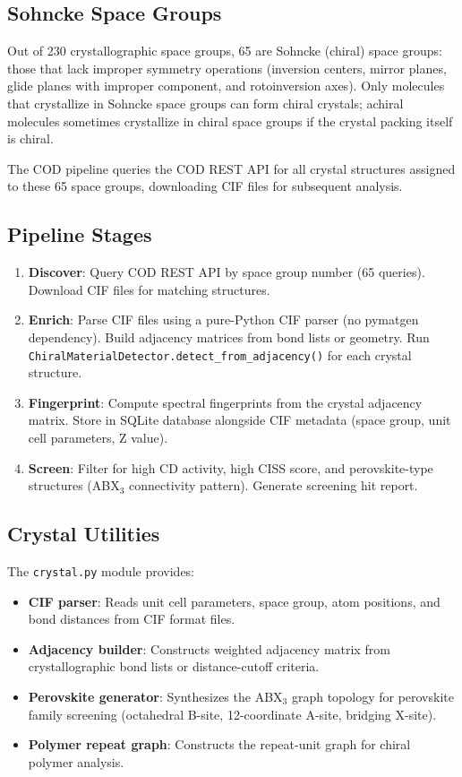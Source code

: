 \documentclass[11pt,a4paper]{article}
\begin{document}
\subsection{Sohncke Space Groups}

Out of 230 crystallographic space groups, 65 are Sohncke (chiral) space groups:
those that lack improper symmetry operations (inversion centers, mirror planes,
glide planes with improper component, and rotoinversion axes). Only molecules
that crystallize in Sohncke space groups can form chiral crystals; achiral
molecules sometimes crystallize in chiral space groups if the crystal packing
itself is chiral.

The COD pipeline queries the COD REST API for all crystal structures assigned
to these 65 space groups, downloading CIF files for subsequent analysis.

\subsection{Pipeline Stages}

\begin{enumerate}[leftmargin=1.5em]
  \item \textbf{Discover}: Query COD REST API by space group number (65 queries).
    Download CIF files for matching structures.
  \item \textbf{Enrich}: Parse CIF files using a pure-Python CIF parser (no
    pymatgen dependency). Build adjacency matrices from bond lists or geometry.
    Run \texttt{ChiralMaterialDetector.detect\_from\_adjacency()} for each
    crystal structure.
  \item \textbf{Fingerprint}: Compute spectral fingerprints from the crystal
    adjacency matrix. Store in SQLite database alongside CIF metadata (space
    group, unit cell parameters, Z value).
  \item \textbf{Screen}: Filter for high CD activity, high CISS score, and
    perovskite-type structures (ABX$_3$ connectivity pattern). Generate
    screening hit report.
\end{enumerate}

\subsection{Crystal Utilities}

The \texttt{crystal.py} module provides:

\begin{itemize}[leftmargin=1.5em]
  \item \textbf{CIF parser}: Reads unit cell parameters, space group, atom
    positions, and bond distances from CIF format files.
  \item \textbf{Adjacency builder}: Constructs weighted adjacency matrix from
    crystallographic bond lists or distance-cutoff criteria.
  \item \textbf{Perovskite generator}: Synthesizes the ABX$_3$ graph topology
    for perovskite family screening (octahedral B-site, 12-coordinate A-site,
    bridging X-site).
  \item \textbf{Polymer repeat graph}: Constructs the repeat-unit graph for
    chiral polymer analysis.
\end{itemize}
\end{document}
